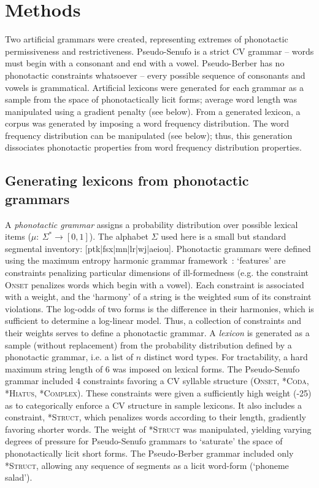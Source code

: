\documentclass[11pt]{article}
\begin{document}
\section{Methods}
\vspace*{-5pt}
Two artificial grammars were created, representing extremes of phonotactic permissiveness and restrictiveness. Pseudo-Senufo is a strict CV grammar -- words must begin with a consonant and end with a vowel.
Pseudo-Berber has no phonotactic constraints whatsoever -- every possible sequence of consonants and vowels is grammatical. Artificial lexicons were generated for each grammar as a sample from the space of phonotactically licit forms; average word length was manipulated using a gradient penalty (see below). From a generated lexicon, a corpus was generated by imposing a word frequency distribution. The word frequency distribution can be manipulated (see below); thus, this generation dissociates phonotactic properties from word frequency distribution properties.
 
\subsection{Generating lexicons from phonotactic grammars}

A \textit{phonotactic grammar} assigns a probability distribution over possible lexical items ($\mu:~\Sigma^* \rightarrow[0,1]$). The alphabet $\Sigma$ used here is a small but standard segmental inventory: [ptk|fsx|mn|lr|wj|aeiou]. Phonotactic grammars were defined using the maximum entropy harmonic grammar framework~\cite{Hayes08a}: `features' are constraints penalizing particular dimensions of ill-formedness (e.g. the constraint \textsc{Onset} penalizes words which begin with a vowel). Each constraint is associated with a weight, and the `harmony' of a string is the weighted sum of its constraint violations. The log-odds of two forms is the difference in their harmonies, which is sufficient to determine a log-linear model. Thus, a collection of constraints and their weights serves to define a phonotactic grammar. A \textit{lexicon} is generated as a sample (without replacement) from the probability distribution defined by a phonotactic grammar, i.e. a list of $n$ distinct word types. For tractability, a hard maximum string length of 6 was imposed on lexical forms. The Pseudo-Senufo grammar included 4 constraints favoring a CV syllable structure (\textsc{Onset, *Coda, *Hiatus, *Complex}). These constraints were given a sufficiently high weight (-25) as to categorically enforce a CV structure in sample lexicons. It also includes a constraint, \textsc{*Struct}, which penalizes words according to their length, gradiently favoring shorter words. The weight of \textsc{*Struct} was manipulated, yielding varying degrees of pressure for Pseudo-Senufo grammars to `saturate' the space of phonotactically licit short forms. The Pseudo-Berber grammar included only \textsc{*Struct}, allowing any sequence of segments as a licit word-form (`phoneme salad'). 
\end{document}
